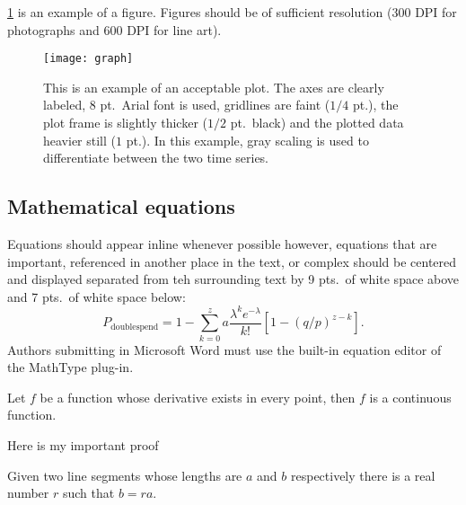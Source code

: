 \documentclass{ledger}
\begin{document}
\cref{fig:1} is an example of a figure.  Figures should be of sufficient resolution (300 DPI for photographs and 600 DPI for line art).

\begin{figure}[ht]
\centering
\texttt{[image: graph]}
\caption{This is an example of an acceptable plot.  The axes are clearly labeled, 8 pt.\ Arial font is used, gridlines are faint ($1/4$ pt.), the plot frame is slightly thicker ($1/2$ pt.\ black) and the plotted data heavier still ($1$ pt.).  In this example, gray scaling is used to differentiate between the two time series.}
\label{fig:1}
\end{figure}

\subsection{Mathematical equations}

Equations should appear inline whenever possible however, equations that are important, referenced in another place in the text, or complex should be centered and displayed separated from teh surrounding text by 9 pts.\ of white space above and 7 pts.\ of white space below:
\begin{equation}
P_{\text{doublespend}}=1-\sum _{k=0}^za\frac{\lambda ^ke^{-\lambda}}{k!}\left[ 1-(q/p)^{z-k}\right] .
\end{equation}
Authors submitting in Microsoft Word must use the built-in equation editor of the MathType plug-in.





\begin{theorem}
Let $f$ be a function whose derivative exists in every point, then $f$
is a continuous function.
\end{theorem}

\begin{myproof}
Here is my important proof
\end{myproof}

\begin{lemma}
Given two line segments whose lengths are $a$ and $b$ respectively there
is a real number $r$ such that $b=ra$.
\end{lemma}

\end{document}
